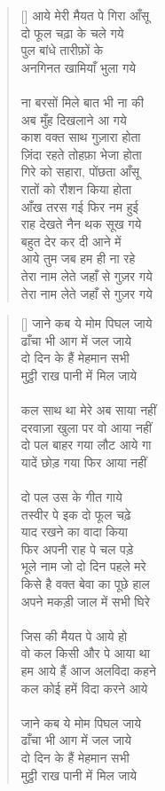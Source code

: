 \begin{verse}[\versewidth]\texthindi{
आये मेरी मैयत पे गिरा आँसू\\
दो फूल चढ़ा के चले गये\\
पुल बांधे तारीफ़ों के\\
अनगिनत खामियाँ भुला गये\\
\\
ना बरसों मिले बात भी ना की\\
अब मुँह दिखलाने आ गये\\
काश वक्त साथ गुज़ारा होता\\
ज़िंदा रहते तोहफ़ा भेजा होता\\
गिरे को सहारा, पोंछता आँसू\\
रातों को रौशन किया होता\\
आँख तरस गई फिर नम हुई\\
राह देखते नैन थक सूख गये\\
बहुत देर कर दी आने में\\
आये तुम जब हम ही ना रहे\\
तेरा नाम लेते जहाँ से गुज़र गये\\
तेरा नाम लेते जहाँ से गुज़र गये
}\end{verse}

\begin{verse}[\versewidth]\texthindi{
जाने कब ये मोम पिघल जाये\\
ढाँचा भी आग में जल जाये\\
दो दिन के हैं मेहमान सभी\\
मुट्ठी राख पानी में मिल जाये\\
\\
कल साथ था मेरे अब साया नहीं\\
दरवाज़ा खुला पर वो आया नहीं\\
दो पल बाहर गया लौट आये गा\\
यादें छोड़ गया फिर आया नहीं\\
\\
दो पल उस के गीत गाये\\
तस्वीर पे इक दो फूल चढ़े \\
याद रखने का वादा किया\\
फिर अपनी राह पे चल पड़े\\
भूले नाम जो दो दिन पहले मरे\\
किसे है वक्त बेवा का पूछे हाल\\
अपने मकड़ी जाल में सभी घिरे\\
\\
जिस की मैयत पे आये हो\\
वो कल किसी और पे आया था\\
हम आये हैं आज अलविदा कहने\\
कल कोई हमें विदा करने आये\\
\\
जाने कब ये मोम पिघल जाये\\
ढाँचा भी आग में जल जाये\\
दो दिन के हैं मेहमान सभी\\
मुट्ठी राख पानी में मिल जाये
}\end{verse}

